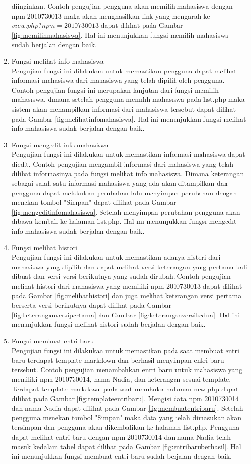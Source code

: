 \begin{enumerate}[(1)]
	diinginkan. Contoh pengujian pengguna akan memilih mahasiswa dengan npm
	2010730013 maka akan menghasilkan link yang mengarah ke
	$view.php?npm=2010730013$ dapat dilihat pada Gambar \ref{fig:memilihmahasiswa}.
	Hal ini menunjukkan fungsi memilih mahasiswa sudah berjalan dengan baik.
\item Fungsi melihat info mahasiswa\\
	Pengujian fungsi ini dilakukan untuk memastikan pengguna dapat melihat
	informasi mahasiswa dari mahasiswa yang telah dipilih oleh pengguna. Contoh
	pengujian fungsi ini merupakan lanjutan dari fungsi memilih mahasiswa, dimana
	setelah pengguna memilih mahasiswa pada list.php maka sistem akan menampilkan
	informasi dari mahasiswa tersebut dapat dilihat pada Gambar
	\ref{fig:melihatinfomahasiswa}. Hal ini menunjukkan fungsi melihat info
	mahasiswa sudah berjalan dengan baik.
\item Fungsi mengedit info mahasiswa\\
	Pengujian fungsi ini dilakukan untuk memastikan informasi mahasiswa dapat
	diedit. Contoh pengujian mengambil informasi dari mahasiswa yang telah dilihat
	informasinya pada fungsi melihat info mahasiswa. Dimana keterangan sebagai
	salah satu informasi mahasiswa yang ada akan ditampilkan dan pengguna dapat
	melakukan perubahan lalu menyimpan perubahan dengan menekan tombol "Simpan"
	dapat dilihat pada Gambar \ref{fig:mengeditinfomahasiswa}. Setelah menyimpan
	perubahan pengguna akan dibawa kembali ke halaman list.php. Hal ini
	menunjukkan fungsi mengedit info mahasiswa sudah berjalan dengan baik.
\item Fungsi melihat histori\\
	Pengujian fungsi ini dilakukan untuk memastikan adanya histori dari mahasiswa
	yang dipilih dan dapat melihat versi keterangan yang pertama kali dibuat dan
	versi-versi berikutnya yang sudah dirubah. Contoh pengujian melihat
	histori dari mahasiswa yang memiliki npm 2010730013 dapat dilihat pada Gambar
	\ref{fig:melihathistori} dan juga melihat keterangan versi pertama berserta
	versi berikutnya dapat dilihat pada Gambar \ref{fig:keteranganversipertama} dan
	Gambar \ref{fig:keteranganversikedua}. Hal ini menunjukkan fungsi melihat
	histori sudah berjalan dengan baik.
\item Fungsi membuat entri baru\\
	Pengujian fungsi ini dilakukan untuk memastikan pada saat membuat entri baru
	terdapat template markdown dan berhasil menyimpan entri baru tersebut. Contoh
	pengujian menambahkan entri baru untuk mahasiswa yang memiliki npm 2010730014,
	nama Nadia, dan keterangan sesuai template. Terdapat template markdown pada
	saat membuka halaman new.php dapat dilihat pada Gambar
	\ref{fig:templateentribaru}. Mengisi data npm 2010730014 dan nama Nadia dapat
	dilihat pada Gambar \ref{fig:membuatentribaru}. Setelah pengguna menekan tombol
	"Simpan" maka data yang telah dimasukan akan tersimpan dan pengguna akan
	dikembalikan ke halaman list.php. Pengguna dapat melihat entri baru dengan npm
	2010730014 dan nama Nadia telah masuk kedalam tabel dapat dilihat pada
	Gambar \ref{fig:entribaruberhasil}. Hal ini menunjukkan fungsi membuat entri
	baru sudah berjalan dengan baik.
\end{enumerate}

